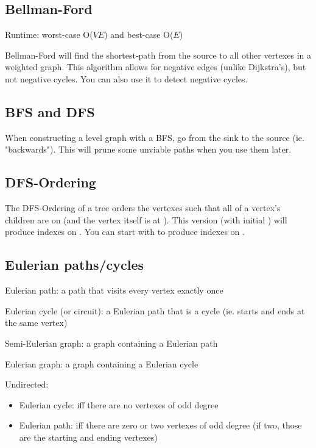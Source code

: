 
\subsection*{Bellman-Ford}

Runtime: worst-case O($VE$) and best-case O($E$)

Bellman-Ford will find the shortest-path from the source to all other vertexes in a weighted graph. This algorithm allows for negative edges (unlike Dijkstra's), but not negative cycles. You can also use it to detect negative cycles.



\subsection*{BFS and DFS}

When constructing a level graph with a BFS, go from the sink to the source (ie. "backwards"). This will prune some unviable paths when you use them later.

\subsection*{DFS-Ordering}

The DFS-Ordering of a tree orders the vertexes such that all of a vertex's children are on  (and the vertex itself is at ). This version (with initial ) will produce indexes on \inline{[0, numVertexes-1]}. You can start with  to produce indexes on \inline{[1, numVertexes]}.



\subsection*{Eulerian paths/cycles}

Eulerian path: a path that visits every vertex exactly once

Eulerian cycle (or circuit): a Eulerian path that is a cycle (ie. starts and ends at the same vertex)

Semi-Eulerian graph: a graph containing a Eulerian path

Eulerian graph: a graph containing a Eulerian cycle

Undirected: 
\begin{itemize}
    \item Eulerian cycle: iff there are no vertexes of odd degree
    \item Eulerian path: iff there are zero or two vertexes of odd degree (if two, those are the starting and ending vertexes)
\end{itemize}

